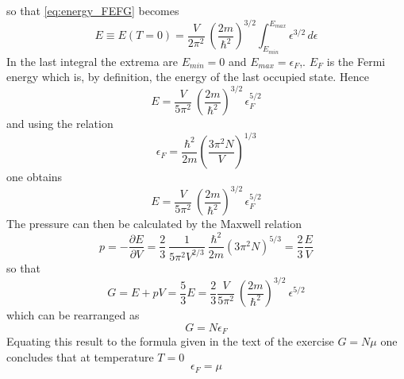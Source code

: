 \documentclass{article}
\begin{document}
so that \ref{eq:energy_FEFG} becomes 
\begin{equation*}
    E \equiv E(T=0) = \frac{V}{2\pi^2} \ \left(\frac{2m}{\hbar^2}\right)^{3/2} \int_{E_{min}}^{E_{max}} \epsilon^{3/2} \, d\epsilon
\end{equation*}
In the last integral the extrema are $E_{min} = 0$ and $E_{max} = \epsilon_F$,. $E_F$ is the Fermi energy which is, by definition, the energy of 
the last occupied state. Hence
\begin{equation}
    E = \frac{V}{5\pi^2} \ \left(\frac{2m}{\hbar^2}\right)^{3/2} \, \epsilon_F^{5/2}
    \label{eq:energy_energyfermi}
\end{equation}
and using the relation 
\begin{equation*}
    \epsilon_F = \frac{\hbar^2}{2m} \left(\frac{3\pi^2N}{V}\right)^{1/3}
\end{equation*}
one obtains
\begin{equation*}
    E = \frac{V}{5\pi^2} \ \left(\frac{2m}{\hbar^2}\right)^{3/2} \, \epsilon_F^{5/2}
\end{equation*}
The pressure can then be calculated by the Maxwell relation 
$$p = -\frac{\partial E}{\partial V} = \frac{2}{3} \ \frac{1}{5\pi^2 V^{2/3}} \ \frac{\hbar^2}{2m} (3\pi^2N)^{5/3} = \frac{2}{3}\frac{E}{V}$$
so that 
$$G = E + pV = \frac{5}{3} E = \frac{2}{3} \frac{V}{5\pi^2} \ \left(\frac{2m}{\hbar^2}\right)^{3/2} \ \epsilon^{5/2}$$
which can be rearranged as
$$G = N \epsilon_F$$
Equating this result to the formula given in the text of the exercise $G = N\mu$ one concludes that at temperature $T=0$ 
\begin{equation}
    \epsilon_F = \mu
\end{equation}
\end{document}
